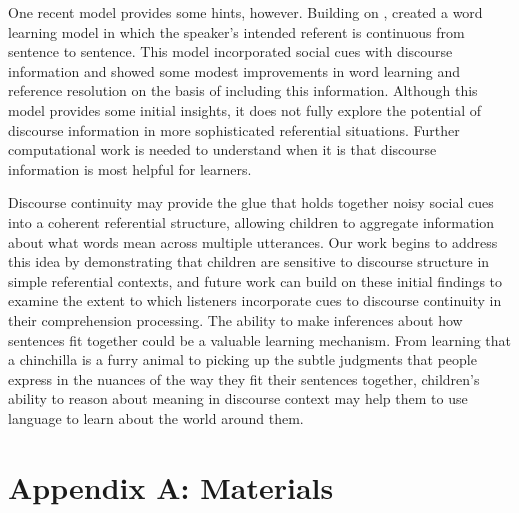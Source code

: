 \documentclass[man]{apa2}
\begin{document}
One recent model provides some hints, however. Building on ,  created a word learning model in which the speaker's intended referent is continuous from sentence to sentence. This model incorporated social cues with discourse information and showed some modest improvements in word learning and reference resolution on the basis of including this information. Although this model provides some initial insights, it does not fully explore the potential of discourse information in more sophisticated referential situations. Further computational work is needed to understand when it is that discourse information is most helpful for learners. 

Discourse continuity may provide the glue that holds together noisy social cues into a coherent referential structure, allowing children to aggregate information about what words mean across multiple utterances.  Our work begins to address this idea by demonstrating that children are sensitive to discourse structure in simple referential contexts, and future work can build on these initial findings to examine the extent to which listeners incorporate cues to discourse continuity in their comprehension processing.  The ability to make inferences about how sentences fit together could be a valuable learning mechanism. From learning that a chinchilla is a furry animal to picking up the subtle judgments that people express in the nuances of the way they fit their sentences together, children's ability to reason about meaning in discourse context may help them to use language to learn about the world around them. 




\newpage
\theappendix 

\section{Appendix A: Materials}
\end{document}
